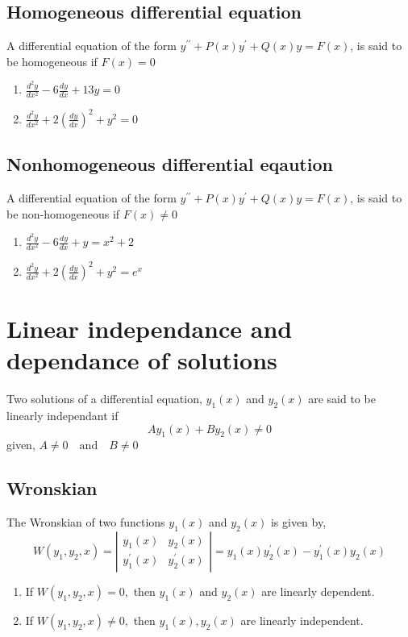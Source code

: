 \subsection{Homogeneous differential equation}
A differential equation of the form
$y^{\prime \prime}+P(x) y^{\prime}+Q(x) y=F(x)$, is said to be  homogeneous if $F(x)= 0$
\begin{example}
	\hspace{0.5cm}
	\begin{enumerate}
		\item 	$\frac{d^{2} y}{d x^{2}}-6 \frac{d y}{d x}+13 y=0$
		\item $\frac{d^{2} y}{d x^{2}}+2\left(\frac{d y}{d x}\right)^{2}+y^{2}=0$
	\end{enumerate}

\end{example}
\subsection{Nonhomogeneous differential eqaution} A differential equation of the form
$y^{\prime \prime}+P(x) y^{\prime}+Q(x) y=F(x)$, is said to be  non-homogeneous if $F(x)\neq 0$
\begin{example}
\hspace{0.5cm}
\begin{enumerate}
	\item 	$\frac{d^{2} y}{d x^{2}}-6 \frac{d y}{d x}+ y=x^{2}+2$
	\item $\frac{d^{2} y}{d x^{2}}+2\left(\frac{d y}{d x}\right)^{2}+y^{2}=e^{x}$
\end{enumerate}
\end{example}
\section{Linear independance and dependance of solutions}
Two solutions of a differential equation, $ y_{1}(x)$ and $ y_{2}(x)$ are said to be linearly independant if \\$$Ay_{1}(x)+By_{2}(x)\neq 0 $$ given, $ A\neq0 \quad\text{and}\quad B\neq0$
\subsection{Wronskian}
The Wronskian of two functions $y_{1}(x)$ and $y_{2}(x)$ is given by,
$$
W\left(y_{1}, y_{2}, x\right)=\left|\begin{array}{ll}
y_{1}(x) & y_{2}(x) \\
y_{1}^{\prime}(x) & y_{2}^{\prime}(x)
\end{array}\right|=y_{1}(x) y_{2}^{\prime}(x)-y_{1}^{\prime}(x) y_{2}(x)
$$
\begin{enumerate}
	\item If $W\left(y_{1}, y_{2}, x\right)=0,$ then $y_{1}(x)$ and $y_{2}(x)$ are linearly dependent.
	\item If $W\left(y_{1}, y_{2}, x\right) \neq 0,$ then $y_{1}(x), y_{2}(x)$ are linearly independent.
\end{enumerate}

